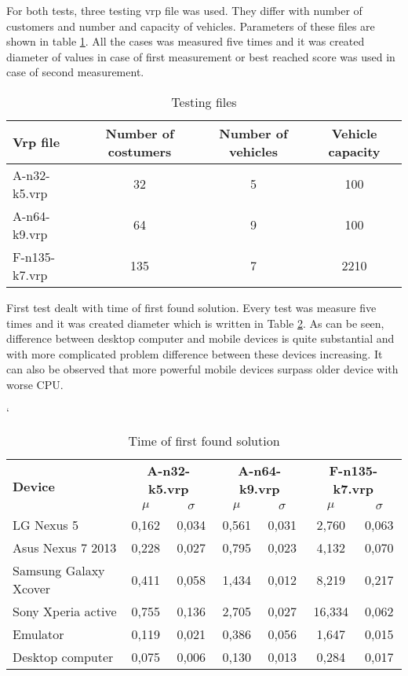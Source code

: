 For both tests, three testing vrp file was used. They differ with number of customers and number and capacity of
vehicles. Parameters of these files are shown in table \ref{TestingFilesTable}. All the cases was measured five times
and it was created diameter of values in case of first measurement or best reached score was used in case of second
measurement.

\begin {table}[h!]
    \begin{tabular}{|l|c|c|c|}
        \hline
        \textbf{Vrp file} &
        \textbf{Number of costumers} &
        \textbf{Number of vehicles} &
        \textbf{Vehicle capacity} \\ \hline \hline
        A-n32-k5.vrp   & 32   & 5 & 100  \\ \hline
        A-n64-k9.vrp   & 64   & 9 & 100  \\ \hline
        F-n135-k7.vrp  & 135  & 7 & 2210 \\ \hline
    \end{tabular}
    \centering
    \caption{Testing files}
    \label{TestingFilesTable}
\end{table}

First test dealt with time of first found solution. Every test was measure five times and it was created diameter which
is written in Table \ref{FirstFoundTable}. As can be seen, difference between desktop computer and mobile devices is
quite substantial and with more complicated problem difference between these devices increasing. It can also be observed
that more powerful mobile devices surpass older device with worse CPU.

\begin {table}[h!]
    \catcode`
    \begin{tabular}{|l|c|c|c|c|c|c|}
        \hline
        \multirow{2}{*}{\textbf{Device}} &
        \multicolumn{2}{c|}{\textbf{A-n32-k5.vrp}} &
        \multicolumn{2}{c|}{\textbf{A-n64-k9.vrp}} &
        \multicolumn{2}{c|}{\textbf{F-n135-k7.vrp}} \\ \cline{2-7}
        & $\mu$ & $\sigma$ & $\mu$ & $\sigma$ & $\mu$ & $\sigma$ \\ \hline \hline
        LG Nexus 5            & 0,162 & 0,034 & 0,561 & 0,031 & 2,760  & 0,063 \\ \hline
        Asus Nexus 7 2013     & 0,228 & 0,027 & 0,795 & 0,023 & 4,132  & 0,070 \\ \hline
        Samsung Galaxy Xcover & 0,411 & 0,058 & 1,434 & 0,012 & 8,219  & 0,217 \\ \hline
        Sony Xperia active    & 0,755 & 0,136 & 2,705 & 0,027 & 16,334 & 0,062 \\ \hline
        Emulator              & 0,119 & 0,021 & 0,386 & 0,056 & 1,647  & 0,015 \\ \hline
        Desktop computer      & 0,075 & 0,006 & 0,130 & 0,013 & 0,284  & 0,017 \\ \hline
    \end{tabular}
    \centering
    \caption{Time of first found solution}
    \label{FirstFoundTable}
\end{table}

